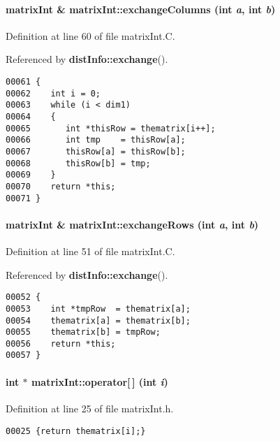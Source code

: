 \paragraph{\setlength{\rightskip}{0pt plus 5cm}matrix\-Int \& matrix\-Int::exchange\-Columns (int {\em a}, int {\em b})}\hfill



Definition at line 60 of file matrix\-Int.C.

Referenced by {\bf dist\-Info::exchange}().\small\begin{verbatim}00061 {
00062    int i = 0;
00063    while (i < dim1)
00064    {
00065       int *thisRow = thematrix[i++];
00066       int tmp    = thisRow[a];
00067       thisRow[a] = thisRow[b];
00068       thisRow[b] = tmp;
00069    }
00070    return *this;
00071 }
\end{verbatim}\normalsize 
\label{matrixInt_a6}
\paragraph{\setlength{\rightskip}{0pt plus 5cm}matrix\-Int \& matrix\-Int::exchange\-Rows (int {\em a}, int {\em b})}\hfill



Definition at line 51 of file matrix\-Int.C.

Referenced by {\bf dist\-Info::exchange}().\small\begin{verbatim}00052 {
00053    int *tmpRow  = thematrix[a];
00054    thematrix[a] = thematrix[b];
00055    thematrix[b] = tmpRow;
00056    return *this;
00057 }
\end{verbatim}\normalsize 
\label{matrixInt_a3}
\paragraph{\setlength{\rightskip}{0pt plus 5cm}int $\ast$ matrix\-Int::operator[$\,$] (int {\em i})\hspace{0.3cm}{\tt  [inline]}}\hfill



Definition at line 25 of file matrix\-Int.h.\small\begin{verbatim}00025 {return thematrix[i];}
\end{verbatim}\normalsize 
\label{matrixInt_a8}
